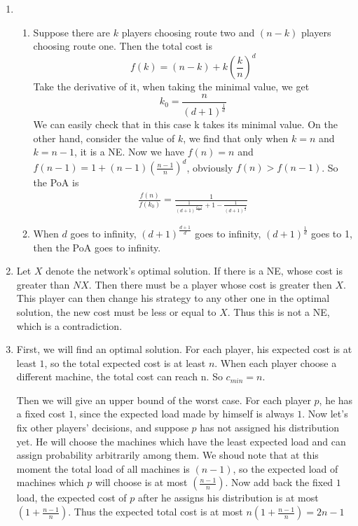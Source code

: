 \documentclass[12pt]{cgtmd}
\begin{document}

\begin{enumerate}
    \item 
        \begin{enumerate}
            \item Suppose there are $k$ players choosing route two and $(n - k)$ players choosing route one. Then the total cost is
                $$f(k) = (n - k) + k(\frac{k}{n})^d$$
                Take the derivative of it, when taking the minimal value, we get 
                $$k_0 = \frac{n}{(d + 1)^{\frac{1}{d}}}$$
                We can easily check that in this case k takes its minimal value.
                On the other hand, consider the value of $k$, we find that only when $k = n$ and $k = n - 1$, it is a NE.
                Now we have $f(n) = n$ and $f(n - 1) = 1 + (n - 1)(\frac{n - 1}{n})^d$, obviously $f(n) > f(n - 1)$.
                So the PoA is 
                \begin{align}
                    \frac{f(n)}{f(k_0)} = \frac{1}{\frac{1}{(d + 1)^{\frac{d + 1}{d}}} + 1 - \frac{1}{(d + 1)^{\frac{1}{d}}}}
                \end{align}
            \item When $d$ goes to infinity, $(d + 1)^{\frac{d + 1}{d}}$ goes to infinity, $(d + 1)^{\frac{1}{d}}$ goes to 1, then the PoA goes to infinity. 
        \end{enumerate}
    \item Let $X$ denote the network's optimal solution. If there is a NE, whose cost is greater than $NX$. Then there must be a player whose cost is greater then $X$. This player can then change his strategy to any other one in the optimal solution, the new cost must be less or equal to $X$. Thus this is not a NE, which is a contradiction.
    \item First, we will find an optimal solution. For each player, his expected cost is at least $1$, so the total expected cost is at least $n$. When each player choose a different machine, the total cost can reach n. So $c_{min} = n$.

        Then we will give an upper bound of the worst case. For each player $p$, he has a fixed cost $1$, since the expected load made by himself is always $1$. Now let's fix other players' decisions, and suppose $p$ has not assigned his distribution yet. He will choose the machines which have the least expected load and can assign probability arbitrarily among them. We shoud note that at this moment the total load of all machines is $(n - 1)$, so the expected load of machines which $p$ will choose is at most $(\frac{n - 1}{n})$. Now add back the fixed $1$ load, the expected cost of $p$ after he assigns his distribution is at most $(1 + \frac{n - 1}{n})$. Thus the expected total cost is at most $n(1 + \frac{n - 1}{n}) = 2n - 1$


\end{enumerate}
\end{document}
